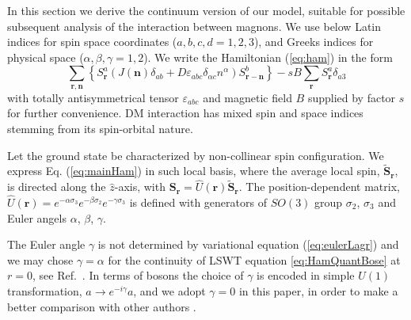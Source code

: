 \documentclass[aps,prb,twocolumn,superscriptaddress,nobalancelastpage]{revtex4-1}
\begin{document}
In this section we derive the continuum version of our model, suitable for possible subsequent analysis of the interaction between magnons.   We use below Latin indices for spin space coordinates ($a,b,c,d = 1,2,3$), and Greeks indices for physical space ($\alpha, \beta, \gamma = 1,2$). We write the 
Hamiltonian   (\ref{eq:ham}) in the form
\begin{equation}
\sum\limits_{\mathbf{r},\mathbf{n}} \left\{ S_{\mathbf{r}}^a\left( J\left( \mathbf{n}\right)\delta _{ab} 
+ D\varepsilon _{abc}\delta _{\alpha c} n^\alpha \right)S_{\mathbf{r} - \mathbf{n}}^b \right\}  - sB\sum\limits_{\mathbf{r}} S_{\mathbf{r}}^a\delta _{a3}
\label{eq:mainHam}
\end{equation}
with  totally antisymmetrical tensor $\varepsilon_{abc}$ and magnetic field $B$ supplied by factor $s$ for further convenience.  DM interaction has mixed spin and space indices stemming from its spin-orbital nature.

Let the ground state be characterized by non-collinear spin configuration. We express Eq. (\ref{eq:mainHam}) in such local basis, where the average local spin, $\tilde {\mathbf{S}}_{\mathbf{r}}$,  is directed along the $\hat z$-axis, with $\mathbf{S}_{\mathbf{r}}  = \hat U\left( \mathbf{r} \right ) \tilde {\mathbf{S}}_{\mathbf{r}}$.
The position-dependent matrix, $\hat U(\mathbf{r}) = e^{-\alpha \sigma_3}e^{-\beta \sigma_2}e^{-\gamma \sigma_3}$ is defined with generators of $SO(3)$ group $\sigma_2$, $\sigma_3$ and Euler angels $\alpha$, $\beta$, $\gamma$.

The Euler angle $\gamma$ is not determined by variational equation (\ref{eq:eulerLagr}) and we may chose  $\gamma = \alpha$ for the continuity of LSWT equation \eqref{eq:HamQuantBose} at $r=0$, see Ref.\ \cite{Aristov2015}.    In terms of bosons the choice of $\gamma$ is encoded in simple $U(1)$ transformation, $a \to e^{ - i\gamma }a$, and we adopt $\gamma = 0$ in this paper, in order to make a better comparison with other authors \cite{Schutte2014}. 
\end{document}

